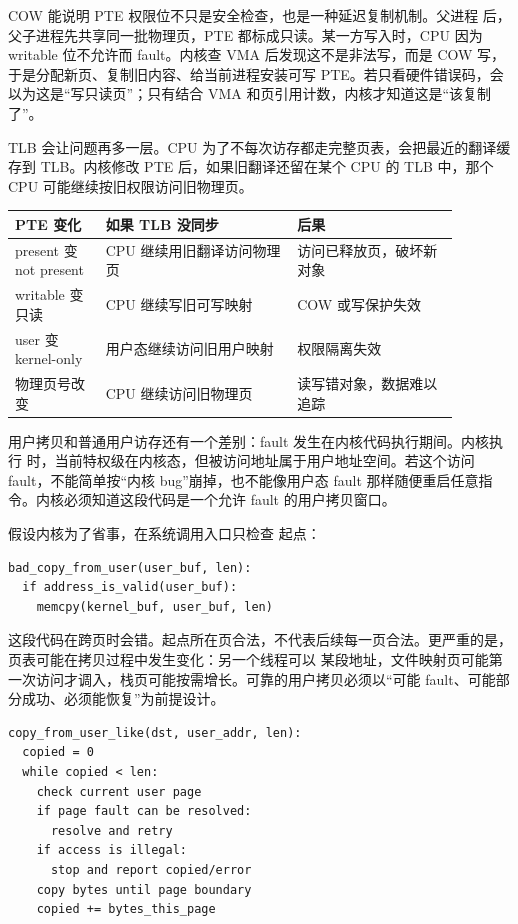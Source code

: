 COW 能说明 PTE 权限位不只是安全检查，也是一种延迟复制机制。父进程  后，父子进程先共享同一批物理页，PTE 都标成只读。某一方写入时，CPU 因为 writable 位不允许而 fault。内核查 VMA 后发现这不是非法写，而是 COW 写，于是分配新页、复制旧内容、给当前进程安装可写 PTE。若只看硬件错误码，会以为这是“写只读页”；只有结合 VMA 和页引用计数，内核才知道这是“该复制了”。

TLB 会让问题再多一层。CPU 为了不每次访存都走完整页表，会把最近的翻译缓存到 TLB。内核修改 PTE 后，如果旧翻译还留在某个 CPU 的 TLB 中，那个 CPU 可能继续按旧权限访问旧物理页。

\begin{longtable}{p{0.18\linewidth}p{0.38\linewidth}p{0.32\linewidth}}
\toprule
PTE 变化 & 如果 TLB 没同步 & 后果 \\
\midrule
present 变 not present & CPU 继续用旧翻译访问物理页 & 访问已释放页，破坏新对象 \\
writable 变只读 & CPU 继续写旧可写映射 & COW 或写保护失效 \\
user 变 kernel-only & 用户态继续访问旧用户映射 & 权限隔离失效 \\
物理页号改变 & CPU 继续访问旧物理页 & 读写错对象，数据难以追踪 \\
\bottomrule
\end{longtable}

用户拷贝和普通用户访存还有一个差别：fault 发生在内核代码执行期间。内核执行  时，当前特权级在内核态，但被访问地址属于用户地址空间。若这个访问 fault，不能简单按“内核 bug”崩掉，也不能像用户态 fault 那样随便重启任意指令。内核必须知道这段代码是一个允许 fault 的用户拷贝窗口。

假设内核为了省事，在系统调用入口只检查  起点：

\begin{lstlisting}
bad_copy_from_user(user_buf, len):
  if address_is_valid(user_buf):
    memcpy(kernel_buf, user_buf, len)
\end{lstlisting}

这段代码在跨页时会错。起点所在页合法，不代表后续每一页合法。更严重的是，页表可能在拷贝过程中发生变化：另一个线程可以  某段地址，文件映射页可能第一次访问才调入，栈页可能按需增长。可靠的用户拷贝必须以“可能 fault、可能部分成功、必须能恢复”为前提设计。

\begin{lstlisting}
copy_from_user_like(dst, user_addr, len):
  copied = 0
  while copied < len:
    check current user page
    if page fault can be resolved:
      resolve and retry
    if access is illegal:
      stop and report copied/error
    copy bytes until page boundary
    copied += bytes_this_page
\end{lstlisting}

